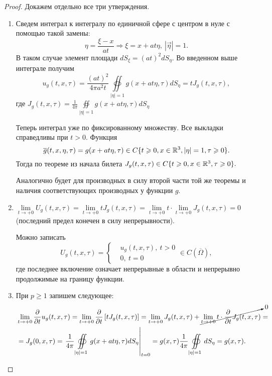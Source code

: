 \documentclass[../main.tex]{subfiles}
\begin{document}
\begin{proof} Докажем отдельно все три утверждения.
\begin{enumerate}
\item Сведем интеграл к интегралу по единичной сфере с центром в нуле с помощью такой замены:
\[
\eta = \frac{\xi - x}{at}\Rightarrow \xi = x+at\eta ,\ |\vec{\eta} |=1.
\]
В таком случае элемент площади $dS_{\xi}=(at)^2dS_{\eta}$. Во введенном выше интеграле получим 
\[
u_g(t,x,\tau)=\frac{(at)^2}{4\pi a^2t}\oiint\limits_{|\eta |=1}g(x+at\eta ,\tau ) dS_{\eta}=tJ_g(t,x,\tau ),
\]
где $\displaystyle J_g(t,x,\tau )= \frac{1}{4\pi}\oiint\limits_{|\eta |=1}g(x+at\eta ,\tau ) dS_{\eta}$

Теперь интеграл уже по фиксированному множеству. Все выкладки справедливы при $t>0$. Функция
\[
\overline{g}(t,x,\eta ,\tau)=g(x+at\eta, \tau)\in C\{t\geqslant 0, x\in \mathbb{R}^3 , |\eta | = 1, \tau\geqslant 0\}.
\]
Тогда по теореме из начала билета $J_g(t,x,\tau )\in C\{t\geqslant 0, x\in \mathbb{R}^3,\tau\geqslant 0\}.$

Аналогично будет для производных в силу второй части той же теоремы и наличия соответствующих производных у функции $g$.

\item $\lim\limits_{t\rightarrow +0}U_g(t,x,\tau )=\lim\limits_{t\rightarrow +0}tJ_g(t,x,\tau )=\lim\limits_{t\rightarrow +0}t\cdot\lim\limits_{t\rightarrow +0}J_g(t,x,\tau ) = 0$ (последний предел конечен в силу непрерывности).

Можно записать
\[
U_g(t,x,\tau ) = \begin{cases}
&u_g(t,x, \tau ),\ t>0\\
&0,\ t=0
\end{cases} \in C\left(\overline{\Omega} \right),
\]
где последнее включение означает непрерывные в области и непрерывно продолжимые на границу функции.

\item При $p\geq 1$ запишем следующее:
\begin{equation*}
\begin{split}
&\lim\limits_{t\rightarrow +0}\frac{\partial}{\partial t} u_g(t,x, \tau) = \lim\limits_{t\rightarrow +0}\frac{\partial}{\partial t}\left[tJ_g(t,x,\tau )\right]=\lim\limits_{t\rightarrow +0}J_g(t,x,\tau )+\cancelto{0}{\lim\limits_{t\rightarrow +0}t\cdot \frac{\partial}{\partial t}J_g(t,x,\tau )}=\\
&=J_g(0, x, \tau )=\left.\frac{1}{4\pi}\oiint\limits_{|\eta |=1}g(x+at\eta ,\tau )dS_{\eta }\right|_{t=0}=g(x, \tau )\frac{1}{4\pi}\oiint\limits_{|\eta |=1}dS_{\eta}=g(x,\tau ).
\end{split}
\end{equation*}
\end{enumerate}
\end{proof}
\end{document}
